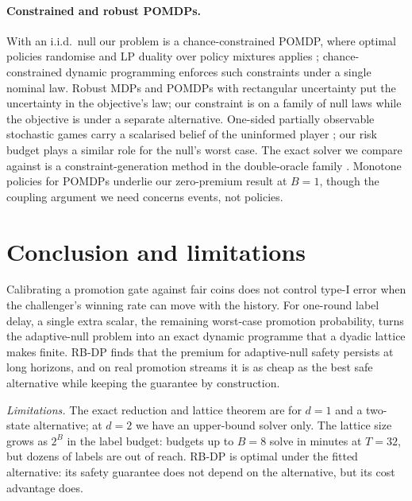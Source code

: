 \documentclass{article}
\theoremstyle{plain}
\theoremstyle{definition}
\theoremstyle{remark}
\begin{document}
\paragraph{Constrained and robust POMDPs.} With an i.i.d.\ null our problem is a chance-constrained POMDP, where optimal policies randomise and LP duality over policy mixtures applies \citep{altman1999constrained,yost2000lp,walraven2018column}; chance-constrained dynamic programming \citep{ono2015chance} enforces such constraints under a single nominal law. Robust MDPs and POMDPs with rectangular uncertainty \citep{iyengar2005robust,nilim2005robust,krale2025evaluating} put the uncertainty in the objective's law; our constraint is on a family of null laws while the objective is under a separate alternative. One-sided partially observable stochastic games carry a scalarised belief of the uninformed player \citep{horak2023solving}; our risk budget plays a similar role for the null's worst case. The exact solver we compare against is a constraint-generation method in the double-oracle family \citep{bosansky2014exact}. Monotone policies for POMDPs \citep{krishnamurthy2016pomdp} underlie our zero-premium result at $B=1$, though the coupling argument we need concerns events, not policies.


\section{Conclusion and limitations}
\label{sec:conclusion}
\label{sec:limitations}

Calibrating a promotion gate against fair coins does not control type-I error when the challenger's winning rate can move with the history. For one-round label delay, a single extra scalar, the remaining worst-case promotion probability, turns the adaptive-null problem into an exact dynamic programme that a dyadic lattice makes finite. RB-DP finds that the premium for adaptive-null safety persists at long horizons, and on real promotion streams it is as cheap as the best safe alternative while keeping the guarantee by construction.

\emph{Limitations.} The exact reduction and lattice theorem are for $d=1$ and a two-state alternative; at $d=2$ we have an upper-bound solver only. The lattice size grows as $2^B$ in the label budget: budgets up to $B=8$ solve in minutes at $T=32$, but dozens of labels are out of reach. RB-DP is optimal under the fitted alternative: its safety guarantee does not depend on the alternative, but its cost advantage does.
\end{document}
